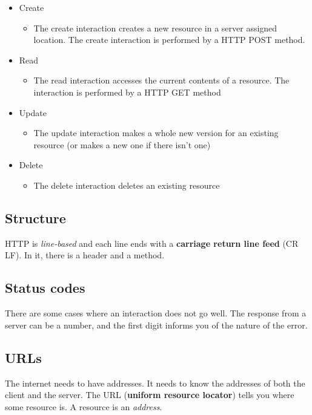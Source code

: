 \documentclass[11pt,a4paper,titlepage,dvipsnames,cmyk]{scrartcl}
\begin{document}
\begin{itemize}
    \item Create
    \begin{itemize}
        \item The create interaction creates a new resource in a server
            assigned location. The create interaction is performed by a
            HTTP POST method.
    \end{itemize}
    \item Read
    \begin{itemize}
        \item The read interaction accesses the current contents of a
            resource. The interaction is performed by a HTTP GET method
    \end{itemize}
    \item Update
    \begin{itemize}
        \item The update interaction makes a whole new version for an
            existing resource (or makes a new one if there isn't one)
    \end{itemize}
    \item Delete
    \begin{itemize}
        \item The delete interaction deletes an existing resource
    \end{itemize}
\end{itemize}

\subsection{Structure}%
\label{sub:Structure}
HTTP is \textit{line-based} and each line ends with a \textbf{carriage
return line feed} (CR LF). In it, there is a header and a method.

\subsection{Status codes}%
\label{sub:Status codes}
There are some cases where an interaction does not go well. The response
from a server can be a number, and the first digit informs you of the
nature of the error.

\subsection{URLs}%
\label{sub:URLs}
The internet needs to have addresses. It needs to know the addresses of
both the client and the server. The URL (\textbf{uniform resource
locator}) tells you where some resource is. A resource is an
\textit{address}.
\end{document}
